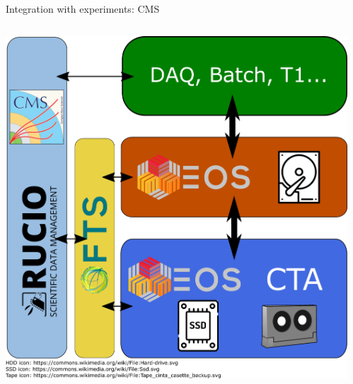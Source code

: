 \documentclass[aspectratio=169]{beamer}
\begin{document}
\begin{frame}{Integration with experiments: CMS}
\begin{columns}
	\begin{column}{0.40\textwidth}
		\begin{center}
		  \includegraphics[keepaspectratio, height=1\textheight, width=1\textwidth]{../images/CTA_deployment_CMS.pdf}
		\end{center}
	\end{column}
	\begin{column}{0.55\textwidth}
	\end{column}
\end{columns}
\end{frame}
\end{document}
